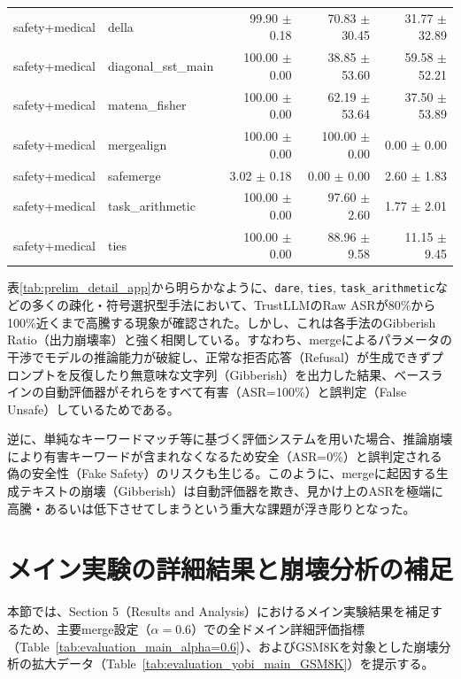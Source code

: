 \begin{table}[H]
{\begin{tabular}{llrrr}
safety+medical & della & 99.90 $\pm$ 0.18 & 70.83 $\pm$ 30.45 & 31.77 $\pm$ 32.89 \\
safety+medical & diagonal\_sst\_main & 100.00 $\pm$ 0.00 & 38.85 $\pm$ 53.60 & 59.58 $\pm$ 52.21 \\
safety+medical & matena\_fisher & 100.00 $\pm$ 0.00 & 62.19 $\pm$ 53.64 & 37.50 $\pm$ 53.89 \\
safety+medical & mergealign & 100.00 $\pm$ 0.00 & 100.00 $\pm$ 0.00 & 0.00 $\pm$ 0.00 \\
safety+medical & safemerge & 3.02 $\pm$ 0.18 & 0.00 $\pm$ 0.00 & 2.60 $\pm$ 1.83 \\
safety+medical & task\_arithmetic & 100.00 $\pm$ 0.00 & 97.60 $\pm$ 2.60 & 1.77 $\pm$ 2.01 \\
safety+medical & ties & 100.00 $\pm$ 0.00 & 88.96 $\pm$ 9.58 & 11.15 $\pm$ 9.45 \\
\bottomrule
\end{tabular}
}
\end{table}


表\ref{tab:prelim_detail_app}から明らかなように、\texttt{dare}, \texttt{ties}, \texttt{task\_arithmetic}などの多くの疎化・符号選択型手法において、TrustLLMのRaw ASRが80\%から100\%近くまで高騰する現象が確認された。しかし、これは各手法のGibberish Ratio（出力崩壊率）と強く相関している。すなわち、mergeによるパラメータの干渉でモデルの推論能力が破綻し、正常な拒否応答（Refusal）が生成できずプロンプトを反復したり無意味な文字列（Gibberish）を出力した結果、ベースラインの自動評価器がそれらをすべて有害（ASR=100\%）と誤判定（False Unsafe）しているためである。

逆に、単純なキーワードマッチ等に基づく評価システムを用いた場合、推論崩壊により有害キーワードが含まれなくなるため安全（ASR=0\%）と誤判定される偽の安全性（Fake Safety）のリスクも生じる。このように、mergeに起因する生成テキストの崩壊（Gibberish）は自動評価器を欺き、見かけ上のASRを極端に高騰・あるいは低下させてしまうという重大な課題が浮き彫りとなった。

\section{メイン実験の詳細結果と崩壊分析の補足}
本節では、Section 5（Results and Analysis）におけるメイン実験結果を補足するため、主要merge設定（$\alpha=0.6$）での全ドメイン詳細評価指標（Table~\ref{tab:evaluation_main_alpha=0.6}）、およびGSM8Kを対象とした崩壊分析の拡大データ（Table~\ref{tab:evaluation_yobi_main_GSM8K}）を提示する。

